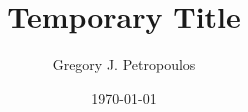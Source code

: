 \documentclass[11pt]{book}
\begin{document}
  \author{Gregory J. Petropoulos}
  \title{Temporary Title}
  \date{\today}

  \frontmatter
  \maketitle
  \tableofcontents
  

  \mainmatter
  
  
  
  
  
  
  

  \backmatter
  
  
  
  \printindex
\end{document}

